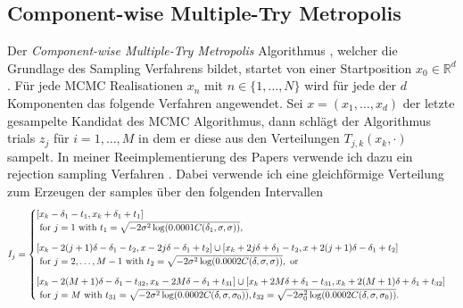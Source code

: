 \documentclass{scrartcl}
\begin{document}
    \subsection{Component-wise Multiple-Try Metropolis} Der \textit{Component-wise Multiple-Try Metropolis} Algorithmus \cite[Algorithm 1]{lau2019},
    welcher die Grundlage des Sampling Verfahrens bildet, startet von einer Startposition
	$x_0\in\mathbb{R}^d$. Für jede MCMC Realisationen $x_n$ mit $n\in\{1,\dots,N\}$ wird für jede der $d$ Komponenten das folgende Verfahren
	angewendet. Sei $x=(x_1,\dots,x_d)$ der letzte gesampelte Kandidat des MCMC Algorithmus, dann schlägt der Algorithmus trials $z_j$
    für $i=1,\dots,M$ in dem er diese aus den Verteilungen $T_{j,k}(x_k,\cdot)$ sampelt. In meiner Reeimplementierung des Papers verwende
    ich dazu ein rejection sampling Verfahren \cite{rejection_sampling}. Dabei verwende ich eine gleichförmige Verteilung zum Erzeugen der samples über den folgenden Intervallen
    \begin{align*}
        I_j = \begin{cases}
                  [x_k-\delta_1-t_1,x_k+\delta_1+t_1]\\\text{ for }j=1\text{ with }t_1 = \sqrt{-2\sigma^2\log(0.0001C(\delta_1,\sigma,\sigma))},\vspace{.25cm}\\
                  [x_k-2(j+1)\delta-\delta_1-t_2,x-2j\delta-\delta_1+t_2]\cup[x_k+2j\delta+\delta_1-t_2,x+2(j+1)\delta-\delta_1+t_2]\\\text{ for }j=2,\dots,M-1\text{ with }t_2=\sqrt{-2\sigma^2\log(0.0002C(\delta,\sigma,\sigma))},\text{ or}\vspace{.25cm}\\
                  [x_k-2(M+1)\delta-\delta_1-t_{32},x_k-2M\delta-\delta_1+t_{31}]\cup[x_k+2M\delta+\delta_1-t_{31},x_k+2(M+1)\delta+\delta_1+t_{32}]\\\text{ for }j=M\text{ with }t_{31}=\sqrt{-2\sigma^2\log(0.0002C(\delta,\sigma,\sigma_0))},t_{32}=\sqrt{-2\sigma_0^2\log(0.0002C(\delta,\sigma,\sigma_0))}.
        \end{cases}
    \end{align*}
\end{document}
